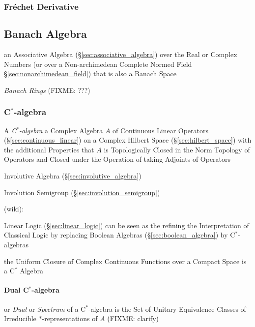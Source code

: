\subsubsection{Fr\'echet Derivative}\label{sec:frechet_derivative}



\subsection{Banach Algebra}\label{sec:banach_algebra}

an Associative Algebra (\S\ref{sec:associative_algebra}) over the Real or
Complex Numbers (or over a Non-archimedean Complete Normed Field
\S\ref{sec:nonarchimedean_field}) that is also a Banach Space

\emph{Banach Rings} (FIXME: ???)



\subsubsection{C$^*$-algebra}\label{sec:cstar_algebra}

A \emph{C$^*$-algebra} a Complex Algebra $A$ of Continuous Linear
Operators (\S\ref{sec:continuous_linear}) on a Complex Hilbert Space
(\S\ref{sec:hilbert_space}) with the additional Properties that $A$ is
Topologically Closed in the Norm Topology of Operators and Closed
under the Operation of taking Adjoints of Operators

Involutive Algebra (\S\ref{sec:involutive_algebra})

Involution Semigroup (\S\ref{sec:involution_semigroup})

(wiki):

Linear Logic (\S\ref{sec:linear_logic}) can be seen as the refining
the Interpretation of Classical Logic by replacing Boolean Algebras
(\S\ref{sec:boolean_algebra}) by C$^*$-algebras

the Uniform Closure of Complex Continuous Functions over a Compact Space is a
C$^*$ Algebra



\paragraph{Dual C$^*$-algebra}\label{sec:cstar_dual}\hfill

or \emph{Dual} or \emph{Spectrum} of a C$^*$-algebra is the Set of Unitary
Equivalence Classes of Irreducible $*$-representations of $A$ (FIXME: clarify)

